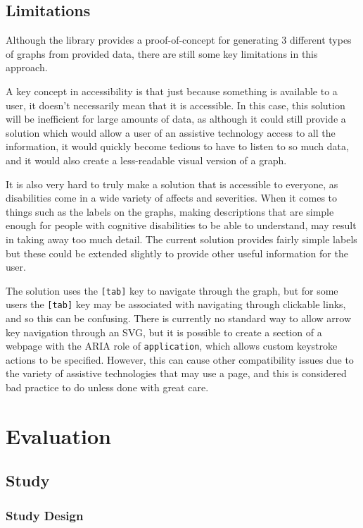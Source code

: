 \documentclass[ %
                    author={Aleena Baig},
                supervisor={Dr Simon Lock},
                    degree={BSc},
                     title={On Making Web Accessible Graphs},
                  subtitle={},
                      year={2019} ]{dissertation}
\begin{document}
\section{Limitations}

Although the library provides a proof-of-concept for generating 3 different types of graphs from provided data, there are still some key limitations in this approach.

A key concept in accessibility is that just because something is available to a user, it doesn't necessarily mean that it is accessible. In this case, this solution will be inefficient for large amounts of data, as although it could still provide a solution which would allow a user of an assistive technology access to all the information, it would quickly become tedious to have to listen to so much data, and it would also create a less-readable visual version of a graph.

It is also very hard to truly make a solution that is accessible to everyone, as disabilities come in a wide variety of affects and severities. When it comes to things such as the labels on the graphs, making descriptions that are simple enough for people with cognitive disabilities to be able to understand, may result in taking away too much detail. The current solution provides fairly simple labels but these could be extended slightly to provide other useful information for the user.

The solution uses the \texttt{[tab]} key to navigate through the graph, but for some users the \texttt{[tab]} key may be associated with navigating through clickable links, and so this can be confusing. There is currently no standard way to allow arrow key navigation through an SVG, but it is possible to create a section of a webpage with the ARIA role of \texttt{application}, which allows custom keystroke actions to be specified. However, this can cause other compatibility issues due to the variety of assistive technologies that may use a page, and this is considered bad practice to do unless done with great care.

\chapter{Evaluation}

\section{Study}

\subsection{Study Design}
\end{document}
